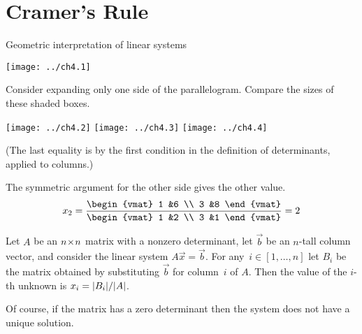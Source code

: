 \documentclass[10pt,t]{beamer}
\begin{document}
\section{Cramer's Rule}
\begin{frame}{Geometric interpretation of linear systems}
\begin{center}
 \texttt{[image: ../ch4.1]}
\end{center}
\end{frame}
\begin{frame}
Consider expanding only one side of the parallelogram.
Compare the sizes of these shaded boxes.
\begin{center}
   \texttt{[image: ../ch4.2]}
   \hfil
   \texttt{[image: ../ch4.3]}
   \hfil
   \texttt{[image: ../ch4.4]}
\end{center}
\pause
{}
(The last equality is by the first condition in the definition of
determinants, applied to columns.)
\end{frame}
\begin{frame}
\pause
The symmetric argument for the other side gives the other value.
\begin{equation*}
  x_2=
  \frac{
  \begin{vmat}
    1  &6  \\
    3  &8
  \end{vmat}}{
  \begin{vmat}
    1  &2  \\
    3  &1
  \end{vmat}}
  =2
\end{equation*}


Let $A$ be an $n \! \times \! n$ matrix with a nonzero determinant,
let $\vec{b}$ be an $n$-tall column vector,
and consider the linear system $A\vec{x}=\vec{b}$.
For any~$i\in[1,\ldots,n]$ let $B_i$ be the matrix obtained by
substituting $\vec{b}$ for column~$i$ of $A$.
Then the value of the $i$-th unknown is $x_i=\deter{B_i}/\deter{A}$.

\pause

\medskip
Of course, if the matrix has a zero determinant then the system does not 
have a unique solution.
\end{frame}
\end{document}
